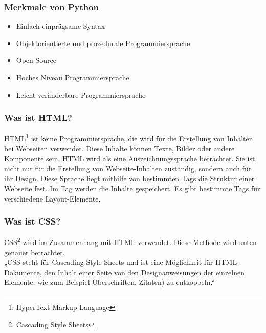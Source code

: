 \subsubsection{Merkmale von Python} 
\begin{itemize}
	\item Einfach einprägsame Syntax
\end{itemize}
\begin{itemize}
	\item Objektorientierte und prozedurale Programmiersprache
\end{itemize}
\begin{itemize}
	\item Open Source 
\end{itemize}
\begin{itemize}
	\item Hoches Niveau Programmiersprache
\end{itemize}
\begin{itemize}
	\item Leicht veränderbare Programmiersprache\cite{50_python}
\end{itemize}
\subsubsection{Was ist HTML?} 
HTML\footnote{HyperText Markup Language} ist keine Programmiersprache, die wird für die Erstellung von Inhalten bei Webseiten verwendet. Diese Inhalte können Texte, Bilder oder andere Komponente sein. HTML wird als eine Auszeichnungssprache betrachtet. Sie ist nicht nur für die Erstellung von Webseite-Inhalten zuständig, sondern auch für ihr Design. Diese Sprache liegt mithilfe von bestimmten Tags die Struktur einer Webseite fest. Im Tag werden die Inhalte gespeichert. Es gibt bestimmte Tags für verschiedene Layout-Elemente.\cite{50_html} %
\subsubsection{Was ist CSS?} 
CSS\footnote{Cascading Style Sheets} wird im Zusammenhang mit HTML verwendet. Diese Methode wird unten genauer betrachtet. \\
„CSS steht für Cascading-Style-Sheets und ist eine Möglichkeit für HTML-Dokumente, den Inhalt einer Seite von den Designanweisungen der einzelnen Elemente, wie zum Beispiel Überschriften, Zitaten) zu entkoppeln.“ \cite{50_css}

